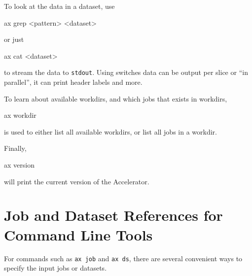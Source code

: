 To look at the data in a dataset, use
\begin{shell}
ax grep <pattern> <dataset>
\end{shell}
or just
\begin{shell}
ax cat <dataset>
\end{shell}
to stream the data to \texttt{stdout}.  Using switches data can be
output per slice or ``in parallel'', it can print header labels and
more.

To learn about available workdirs, and which jobs that exists in workdirs,
\begin{shell}
ax workdir
\end{shell}
is used to either list all available workdirs, or list all jobs in a
workdir.

Finally,
\begin{shell}
ax version
\end{shell}
will print the current version of the Accelerator.



\section{Job and Dataset References for Command Line Tools}
For commands such as \texttt{ax job} and \texttt{ax ds}, there are
several convenient ways to specify the input jobs or datasets.


